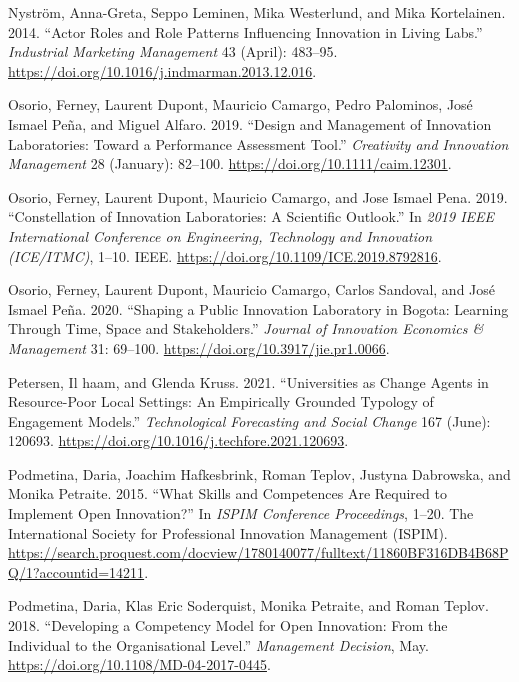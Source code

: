 \documentclass[AMA,STIX1COL,APA,STIX2COL]{WileyNJD-v2}
\newlength{\cslhangindent}
\newenvironment{CSLReferences}[2] %
 {%
  \setlength{\parindent}{0pt}
  \ifodd #1 \everypar{\setlength{\hangindent}{\cslhangindent}}\ignorespaces\fi
  \ifnum #2 > 0
  \setlength{\parskip}{#2\baselineskip}
  \fi
 }%
 {}
\begin{document}
\begin{CSLReferences}{1}{0}
\leavevmode{}%
Nyström, Anna-Greta, Seppo Leminen, Mika Westerlund, and Mika
Kortelainen. 2014. {``Actor Roles and Role Patterns Influencing
Innovation in Living Labs.''} \emph{Industrial Marketing Management} 43
(April): 483--95. \url{https://doi.org/10.1016/j.indmarman.2013.12.016}.

\leavevmode{}%
Osorio, Ferney, Laurent Dupont, Mauricio Camargo, Pedro Palominos, José
Ismael Peña, and Miguel Alfaro. 2019. {``Design and Management of
Innovation Laboratories: Toward a Performance Assessment Tool.''}
\emph{Creativity and Innovation Management} 28 (January): 82--100.
\url{https://doi.org/10.1111/caim.12301}.

\leavevmode{}%
Osorio, Ferney, Laurent Dupont, Mauricio Camargo, and Jose Ismael Pena.
2019. {``Constellation of Innovation Laboratories: A Scientific
Outlook.''} In \emph{2019 IEEE International Conference on Engineering,
Technology and Innovation (ICE/ITMC)}, 1--10. IEEE.
\url{https://doi.org/10.1109/ICE.2019.8792816}.

\leavevmode{}%
Osorio, Ferney, Laurent Dupont, Mauricio Camargo, Carlos Sandoval, and
José Ismael Peña. 2020. {``Shaping a Public Innovation Laboratory in
Bogota: Learning Through Time, Space and Stakeholders.''} \emph{Journal
of Innovation Economics \& Management} 31: 69--100.
\url{https://doi.org/10.3917/jie.pr1.0066}.

\leavevmode{}%
Petersen, Il haam, and Glenda Kruss. 2021. {``Universities as Change
Agents in Resource-Poor Local Settings: An Empirically Grounded Typology
of Engagement Models.''} \emph{Technological Forecasting and Social
Change} 167 (June): 120693.
\url{https://doi.org/10.1016/j.techfore.2021.120693}.

\leavevmode{}%
Podmetina, Daria, Joachim Hafkesbrink, Roman Teplov, Justyna Dabrowska,
and Monika Petraite. 2015. {``What Skills and Competences Are Required
to Implement Open Innovation?''} In \emph{ISPIM Conference Proceedings},
1--20. The International Society for Professional Innovation Management
(ISPIM).
\url{https://search.proquest.com/docview/1780140077/fulltext/11860BF316DB4B68PQ/1?accountid=14211}.

\leavevmode{}%
Podmetina, Daria, Klas Eric Soderquist, Monika Petraite, and Roman
Teplov. 2018. {``Developing a Competency Model for Open Innovation: From
the Individual to the Organisational Level.''} \emph{Management
Decision}, May. \url{https://doi.org/10.1108/MD-04-2017-0445}.


\end{CSLReferences}
\end{document}
